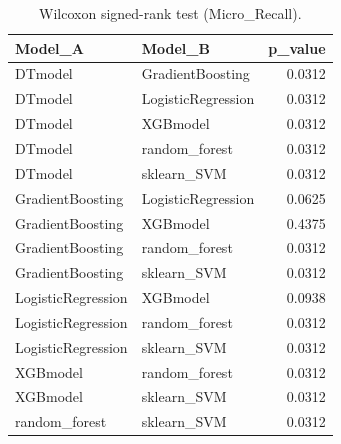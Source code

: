 \begin{table}[t]
\centering
\begin{tabular}{llr}
\toprule
Model_A & Model_B & p_value \\
\midrule
DTmodel & GradientBoosting & 0.0312 \\
DTmodel & LogisticRegression & 0.0312 \\
DTmodel & XGBmodel & 0.0312 \\
DTmodel & random_forest & 0.0312 \\
DTmodel & sklearn_SVM & 0.0312 \\
GradientBoosting & LogisticRegression & 0.0625 \\
GradientBoosting & XGBmodel & 0.4375 \\
GradientBoosting & random_forest & 0.0312 \\
GradientBoosting & sklearn_SVM & 0.0312 \\
LogisticRegression & XGBmodel & 0.0938 \\
LogisticRegression & random_forest & 0.0312 \\
LogisticRegression & sklearn_SVM & 0.0312 \\
XGBmodel & random_forest & 0.0312 \\
XGBmodel & sklearn_SVM & 0.0312 \\
random_forest & sklearn_SVM & 0.0312 \\
\bottomrule
\end{tabular}
\caption{Wilcoxon signed-rank test (Micro_Recall).}
\label{tab:wilcoxon_Micro_Recall}
\end{table}